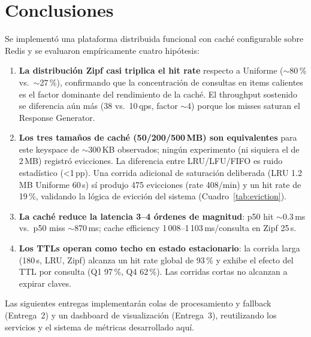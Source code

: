 \documentclass[11pt,a4paper]{article}
\begin{document}
\section{Conclusiones}

Se implementó una plataforma distribuida funcional con caché configurable
sobre Redis y se evaluaron empíricamente cuatro hipótesis:

\begin{enumerate}[leftmargin=*]
\item \textbf{La distribución Zipf casi triplica el hit rate} respecto a
  Uniforme ($\sim$80\,\% vs.\ $\sim$27\,\%), confirmando que la concentración
  de consultas en items calientes es el factor dominante del rendimiento de
  la caché. El throughput sostenido se diferencia aún más (38 vs.\ 10\,qps,
  factor $\sim$4) porque los misses saturan el Response Generator.
\item \textbf{Los tres tamaños de caché (50/200/500\,MB) son equivalentes}
  para este keyspace de $\sim$300\,KB observados; ningún experimento (ni
  siquiera el de 2\,MB) registró evicciones. La diferencia entre LRU/LFU/FIFO
  es ruido estadístico (\textless 1\,pp). Una corrida adicional de
  saturación deliberada (LRU 1.2\,MB Uniforme 60\,s) sí produjo
  475 evicciones (rate 408/min) y un hit rate de 19\,\%, validando la
  lógica de evicción del sistema (Cuadro~\ref{tab:eviction}).
\item \textbf{La caché reduce la latencia 3--4 órdenes de magnitud}: p50
  hit $\sim$0.3\,ms vs.\ p50 miss $\sim$870\,ms; cache efficiency
  1\,008--1\,103\,ms/consulta en Zipf 25\,s.
\item \textbf{Los TTLs operan como techo en estado estacionario}: la
  corrida larga (180\,s, LRU, Zipf) alcanza un hit rate global de 93\,\% y
  exhibe el efecto del TTL por consulta (Q1 97\,\%, Q4 62\,\%). Las corridas
  cortas no alcanzan a expirar claves.
\end{enumerate}

Las siguientes entregas implementarán colas de procesamiento y fallback
(Entrega~2) y un dashboard de visualización (Entrega~3), reutilizando los
servicios y el sistema de métricas desarrollado aquí.
\end{document}
